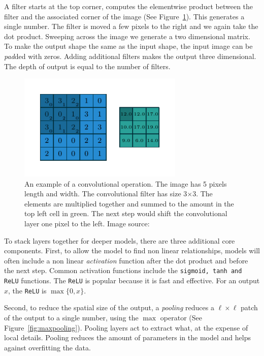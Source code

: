 \documentclass[12pt, a4paper, oneside, headinclude, footinclude]{article}
\begin{document}
A filter starts at the top corner, computes the elementwise product between
the filter and the associated corner of the image (See
Figure~\ref{fig:convolution}).  This generates a single number. The filter is
moved a few pixels to the right and we again take the dot product. Sweeping
across the image we generate a two dimensional matrix. To make the output
shape the same as the input shape, the input image can be \textit{pad}ded with
zeros.  Adding additional filters makes the output three dimensional. The
depth of output is equal to the number of filters. 

\begin{figure}
	\centering
    \includegraphics[width=0.7\textwidth]{numerical_no_padding_no_strides_00.pdf}
    \caption[A convolutional operation] {An example of a convolutional
    operation. The image has 5 pixels length and width. The convolutional
    filter has size 3$\times$3. The elements are multiplied together and
    summed to the amount in the top left cell in green. The next step would
    shift the convolutional layer one pixel to the left.  Image source:
    ~\cite{dumoulin2016guide}\label{fig:convolution}}
\end{figure}

To stack layers together for deeper models, there are three  additional core
components. First, to allow the model to find non linear relationships, models
will often include a non linear \textit{activation} function after the dot
product and before the next step. Common activation functions include the
\texttt{sigmoid, tanh and ReLU} functions. The \texttt{ReLU} is popular
because it is fast and effective. For an output $x$, the
\texttt{ReLU} is $\max\{0, x\}$.

Second, to reduce the spatial size of the output, a \textit{pooling} reduces a
$\ell\times\ell$ patch of the output to a single number, using the $\max$
operator (See Figure~\ref{fig:maxpooling}). Pooling layers act to extract
what, at the expense of local details.  Pooling reduces the amount of
parameters in the model and helps against overfitting the data.
\end{document}
